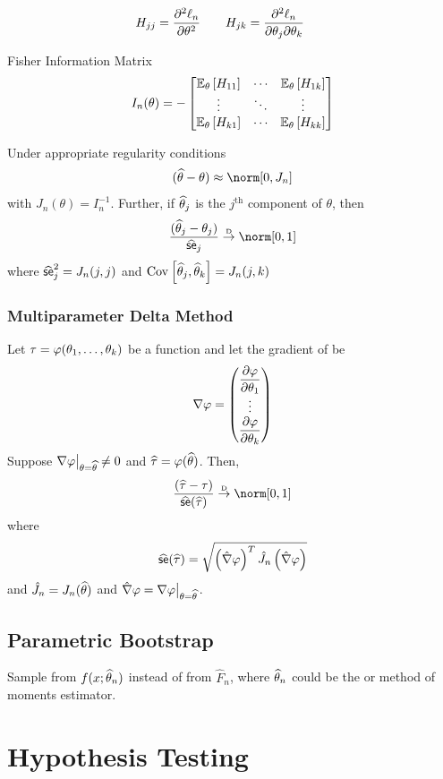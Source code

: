 \documentclass[landscape]{article}
\begin{document}
\begin{multicols*}{2}
$$H_{jj} = \frac{\partial^2 \lln}{\partial\theta^2} \qquad
H_{jk} = \frac{\partial^2 \lln}{\partial\theta_j\partial\theta_k} \qquad$$

Fisher Information Matrix
$$I_n(\theta) = -\begin{bmatrix}
  \E[\theta]{H_{11}} & \cdots & \E[\theta]{H_{1k}} \\
  \vdots & \ddots & \vdots \\
  \E[\theta]{H_{k1}} & \cdots & \E[\theta]{H_{kk}}
\end{bmatrix}$$

Under appropriate regularity conditions
$$(\that-\theta) \approx \norm[0,J_n]$$
with $J_n(\theta) = I_n^{-1}$. Further, if $\that_j$ is the
$j^{\mathrm{th}}$ component of $\theta$, then
$$\frac{(\that_j-\theta_j)}{\sehat_j} \dconv \norm[0,1]$$
where $\sehat_j^2 = J_n(j,j)$ and 
$\cov{\that_j,\that_k} = J_n(j,k)$

\subsubsection{Multiparameter Delta Method}

Let $\tau = \transform(\theta_1,\dots,\theta_k)$ be a function and let
the gradient of \transform be
$$\nabla\transform = \begin{pmatrix}
  \displaystyle\frac{\partial\transform}{\partial\theta_1} \\
  \vdots \\
  \displaystyle\frac{\partial\transform}{\partial\theta_k} \\
\end{pmatrix}$$
Suppose $\bigl.\nabla\transform\bigr|_{\theta=\that} \neq 0$ and
$\widehat{\tau} = \transform(\that)$. Then,
$$\frac{(\widehat{\tau}-\tau)}{\sehat(\widehat{\tau})} \dconv \norm[0,1]$$
where
$$\sehat(\widehat{\tau}) = \sqrt{\left( \hat{\nabla}\transform \right)^T
\hat{J}_n\left( \hat{\nabla}\transform \right)}$$
and $\hat{J}_n = J_n(\that)$ and $\hat{\nabla}\transform =
\bigl.\nabla\transform\bigr|_{\theta=\that}$. 

\subsection{Parametric Bootstrap}

Sample from $f(x;\that_n)$ instead of from $\hat{F}_n$, where
$\that_n$ could be the \mle or method of moments estimator.

\columnbreak

\section{Hypothesis Testing}


\end{multicols*}
\end{document}
